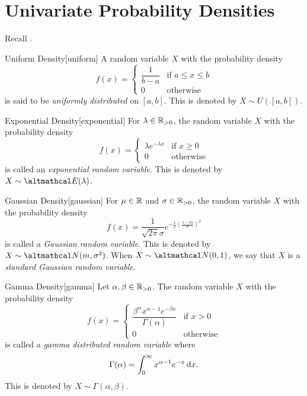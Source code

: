\documentclass[../probability.tex]{subfiles}
\begin{document}
\section{Univariate Probability Densities}

Recall .


\begin{Example}{Uniform Density}[uniform]
    A random variable \(X\) with the probability density
    \[
        f(x) = \begin{cases}
            \dfrac{1}{b-a} & \text{if } a \le x \le b \\
            0 & \text{otherwise}
        \end{cases}
    \]
    is said to be \emph{uniformly distributed} on \([a, b]\).
    This is denoted by \(X \sim U([a, b])\).
\end{Example}

\begin{Example}{Exponential Density}[exponential]
    For \(\lambda \in \RR_{>0}\), the random variable \(X\) with the probability density
    \[
        f(x) = \begin{cases}
            \lambda e^{-\lambda x} & \text{if } x \ge 0 \\
            0 & \text{otherwise}
        \end{cases}
    \]
    is called an \emph{exponential random variable}.
    This is denoted by \(X \sim \mcal{E}(\lambda)\).
\end{Example}

\begin{Example}{Gaussian Density}[gaussian]
    For \(\mu \in \RR\) and \(\sigma \in \RR_{>0}\), the random variable \(X\) with the probability
    density
    \[
        f(x) = \frac{1}{\sqrt{2\pi}\sigma} e^{-\frac{1}{2} \left(\frac{x-m}{\sigma}\right)^2}
    \]
    is called a \emph{Gaussian random variable}.
    This is denoted by \(X \sim \mcal{N}(m, \sigma^2)\).
    When \(X \sim \mcal{N}(0, 1)\), we say that \(X\) is a \emph{standard Gaussian random variable}.
\end{Example}

\begin{Example}{Gamma Density}[gamma]
    Let \(\alpha, \beta \in \RR_{>0}\).
    The random variable \(X\) with the probability density
    \[
        f(x) = \begin{cases}
            \dfrac{\beta^\alpha x^{\alpha-1}e^{-\beta x}}{\Gamma(\alpha)}
            &\text{if }x > 0 \\
            0 & \text{otherwise}
        \end{cases}
    \]
    is called a \emph{gamma distributed random variable}
    where
    \[
        \Gamma(\alpha) = \int_0^\infty x^{\alpha-1} e^{-x} \,\mathrm{d} x\text.
    \]
    This is denoted by \(X \sim \Gamma(\alpha, \beta)\).
\end{Example}
\end{document}
